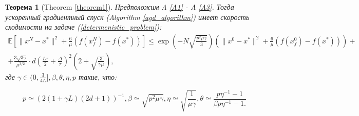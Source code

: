 \documentclass{article}
\newtheorem{theorem}{Теорема}
\begin{document}
\begin{theorem}[Theorem \ref{theorem1}]\label{theorem1_appendix}
   Предположим A \ref{A1} - A \ref{A3}. Тогда ускоренный градиентный спуск (Algorithm \ref{agd_algorithm}) имеет скорость сходимости на задаче (\ref{determenistic_problem}):
  \begin{equation}
   \begin{aligned}
   \mathbb{E}\left[\|x^N - x^*\|^2 + \frac{6}{\mu} (f(x_f^N) - f(x^*))\right] \leqslant \exp\left(- N\sqrt{\frac{p^2\mu\gamma}{3}}\right) \left(\|x^0 - x^*\|^2 + \frac{6}{\mu} (f(x_f^0) - f(x^*))\right) +\\ +\frac{3 \sqrt{3\gamma}}{\mu^{3/2}} \cdot d \left(\frac{L\tau}{2} + \frac{\Delta}{\tau}\right)^2\left(2 + \sqrt{\frac{3}{\gamma\mu}}\right),
   \label{deterministic_convergence}
   \end{aligned}
  \end{equation}
  где $\gamma \in (0, \frac{3}{4L}], \beta, \theta, \eta, p$ такие, что:

  \begin{equation}
   p \simeq (2(1 + \gamma L)(2d + 1))^{-1}, \beta \simeq \sqrt{p^2 \mu \gamma}, \eta \simeq \sqrt{\frac{1}{\mu\gamma}}, \theta \simeq \frac{p \eta^{-1} - 1}{\beta p \eta^{-1} - 1.}
  \end{equation}
\end{theorem}
\end{document}

